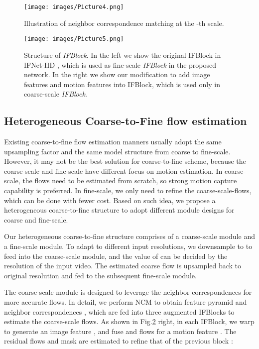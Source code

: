 \documentclass[sigconf]{acmart}
\begin{document}
\begin{figure}
    \texttt{[image: images/Picture4.png]}
    \caption{Illustration of neighbor correspondence matching at the -th scale.}
    \label{fig4}
\end{figure}

\begin{figure}
    \texttt{[image: images/Picture5.png]}
    \caption{Structure of \textit{IFBlock}. In the left we show the original IFBlock in IFNet-HD \cite{huang2020rife}, which is used as fine-scale \textit{IFBlock} in the proposed network. In the right we show our modification to add image features and motion features into IFBlock, which is used only in coarse-scale \textit{IFBlock}.}
    \label{fig5}
\end{figure}

\subsection{Heterogeneous Coarse-to-Fine flow estimation}
\label{sec:3-2}

Existing coarse-to-fine flow estimation manners \cite{sun2018pwc, park2020bmbc, huang2020rife} usually adopt the same upsampling factor and the same model structure from coarse to fine-scale. However, it may not be the best solution for coarse-to-fine scheme, because the coarse-scale and fine-scale have different focus on motion estimation. In coarse-scale, the flows need to be estimated from scratch, so strong motion capture capability is preferred. In fine-scale, we only need to refine the coarse-scale-flows, which can be done with fewer cost. Based on such idea, we propose a heterogeneous coarse-to-fine structure to adopt different module designs for coarse and fine-scale.

Our heterogeneous coarse-to-fine structure comprises of a coarse-scale module and a fine-scale module. To adapt to different input resolutions, we downsample  to  to feed into the coarse-scale module, and the value of  can be decided by the resolution of the input video. The estimated coarse flow is upsampled back to original resolution and fed to the subsequent fine-scale module.

The coarse-scale module is designed to leverage the neighbor correspondences for more accurate flows. In detail, we perform NCM to obtain feature pyramid  and neighbor correspondences , which are fed into three augmented IFBlocks to estimate the coarse-scale flows. As shown in Fig.\ref{fig5} right, in each IFBlock, we warp  to generate an image feature , and fuse  and flows for a motion feature . The residual flows and mask  are estimated to refine that of the previous block : 
\end{document}
